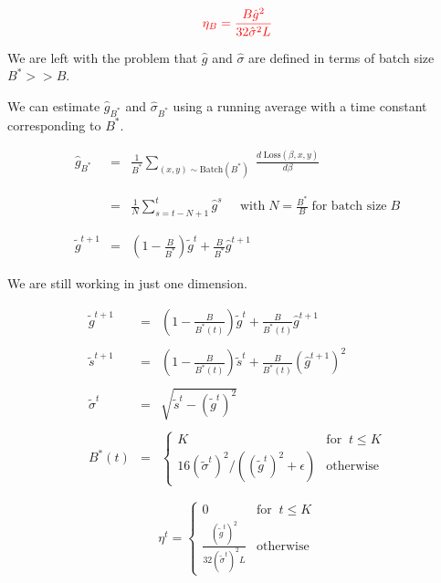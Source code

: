 {

$${\color{red} \eta_B = \frac{B \hat{g}^2}{32\hat{\sigma}^2L}}$$

\vfill
We are left with the problem that $\hat{g}$ and $\hat{\sigma}$ are defined in terms of batch size $B^* >> B$.

\vfill
We can estimate $\hat{g}_{B^*}$ and $\hat{\sigma}_{B^*}$ using a running average with a time constant corresponding to $B^*$.


\begin{eqnarray*}
  \hat{g}_{B^*} & = & \frac{1}{B^*} \sum_{(x,y) \sim \mathrm{Batch}(B^*)}\; \frac{d\;\mathrm{Loss}(\beta,x,y)}{d\beta} \\
  \\
  \\
  & = & \frac{1}{N} \sum_{s=t-N+1}^t \hat{g}^s\;\;\;\;\;\mbox{with}\;N= \frac{B^*}{B} \;\mbox{for batch size}\;B \\
  \\
  \\
  \tilde{g}^{t+1} & = & \left(1-\frac{B}{B^*}\right)\tilde{g}^t + \frac{B}{B^*} \hat{g}^{t+1}
\end{eqnarray*}

\vfill
We are still working in just one dimension.

\begin{eqnarray*}
  \tilde{g}^{t+1} & = & \left(1-\frac{B}{B^*(t)}\right)\tilde{g}^t + \frac{B}{B^*(t)} \hat{g}^{t+1} \\
  \\
  \tilde{s}^{t+1} & = & \left(1-\frac{B}{B^*(t)}\right)\tilde{s}^t + \frac{B}{B^*(t)} (\hat{g}^{t+1})^2 \\
  \\
  \tilde{\sigma}^t & = & \sqrt{\tilde{s}^t - (\tilde{g}^t)^2} \\
  \\
  B^*(t) &= & \left\{\begin{array}{ll} K & \mbox{for}\;\; t \leq K \\
  16(\tilde{\sigma}^t)^2/((\tilde{g}^t)^2 + \epsilon) & \mbox{otherwise} \end{array}\right.
\end{eqnarray*}


$$\eta^t = \left\{\begin{array}{ll} 0 & \mbox{for}\;\;t \leq K \\ \frac{(\tilde{g}^t)^2}{32(\tilde{\sigma}^t)^2L} & \mbox{otherwise}
\end{array}\right.$$

}

